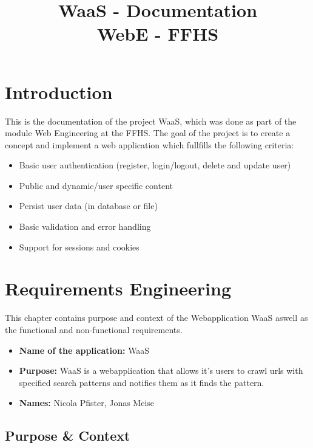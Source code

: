 \documentclass[titlepage, 12pt]{article}
\author{\authorName}
\title{WaaS - Documentation \\ \medskip \large WebE - FFHS}
\begin{document}
\maketitle

\pagebreak

\renewcommand{\contentsname}{Table of Contents}

\tableofcontents

\pagebreak

\section{Introduction}

This is the documentation of the project WaaS, which was done as part of the module Web Engineering at the FFHS. The goal of the project is to create a concept and implement a web application which fullfills the following criteria:

\begin{itemize}
    \item Basic user authentication (register, login/logout, delete and update user)
    \item Public and dynamic/user specific content
    \item Persist user data (in database or file)
    \item Basic validation and error handling
    \item Support for sessions and cookies
\end{itemize}

\section{Requirements Engineering\label{sectionRequirementsEngineering}}

This chapter contains purpose and context of the Webapplication WaaS aswell as the functional and non-functional requirements.

\begin{itemize}
  \item \textbf{Name of the application:} WaaS
  \item \textbf{Purpose:} WaaS is a webapplication that allows it's users to crawl urls with specified search patterns and notifies them as it finds the pattern.
  \item \textbf{Names:} Nicola Pfister, Jonas Meise
\end{itemize}

\subsection{Purpose \& Context}
\end{document}
